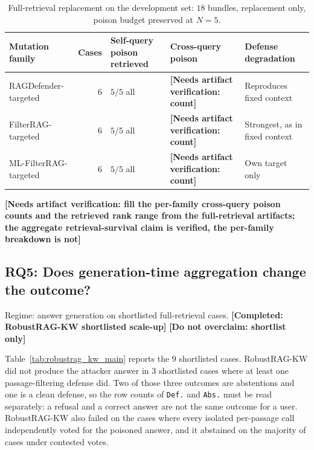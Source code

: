 \documentclass[conference]{IEEEtran}
\newcommand{\COMPLETED}[1]{\textbf{[Completed: #1]}}
\newcommand{\NOOVERCLAIM}[1]{\textbf{[Do not overclaim: #1]}}
\newcommand{\VERIFY}[1]{\textbf{[Needs artifact verification: #1]}}
\newcommand{\NdevQ}{6}           %
\newcommand{\NdevBundles}{18}    %
\newcommand{\NrrkwCases}{9}      %
\newcommand{\Npoison}{5}         %
\begin{document}
\begin{table}[!t]
\centering
\caption{Full-retrieval replacement on the development set: $\NdevBundles$
bundles, replacement only, poison budget preserved at $N=\Npoison$.}
\label{tab:full_retrieval_dev}
\scriptsize
\setlength{\tabcolsep}{3pt}
\renewcommand{\arraystretch}{1.05}
\begin{tabular}{@{}p{}rp{}p{}p{}@{}}
\toprule
Mutation family & Cases & Self-query poison retrieved & Cross-query poison & Defense degradation \\
\midrule
RAGDefender-targeted   & $\NdevQ$ & $\Npoison/\Npoison$ all & \VERIFY{count} & Reproduces fixed context \\
FilterRAG-targeted     & $\NdevQ$ & $\Npoison/\Npoison$ all & \VERIFY{count} & Strongest, as in fixed context \\
ML-FilterRAG-targeted  & $\NdevQ$ & $\Npoison/\Npoison$ all & \VERIFY{count} & Own target only \\
\bottomrule
\end{tabular}
\vspace{2pt}
{\scriptsize \VERIFY{fill the per-family cross-query poison counts and the
retrieved rank range from the full-retrieval artifacts; the aggregate
retrieval-survival claim is verified, the per-family breakdown is not}}
\end{table}

\subsection{RQ5: Does generation-time aggregation change the outcome?}
\label{subsec:rq5}
Regime: answer generation on shortlisted full-retrieval cases.
\COMPLETED{RobustRAG-KW shortlisted scale-up} \NOOVERCLAIM{shortlist only}

Table~\ref{tab:robustrag_kw_main} reports the $\NrrkwCases$ shortlisted cases.
RobustRAG-KW did not produce the attacker answer in 3 shortlisted cases where at
least one passage-filtering defense did. Two of those three outcomes are
abstentions and one is a clean defense, so the row counts of \texttt{Def.} and
\texttt{Abs.} must be read separately: a refusal and a correct answer are not the
same outcome for a user. RobustRAG-KW also failed on the cases where every
isolated per-passage call independently voted for the poisoned answer, and it
abstained on the majority of cases under contested votes.
\end{document}
